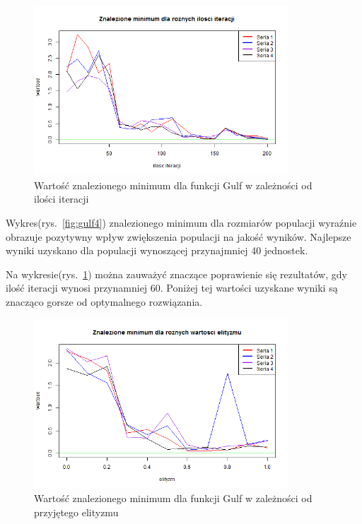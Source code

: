 \documentclass[11pt, a4paper]{article}
\newcommand{\fbi}{\leavevmode{\parindent=1em\indent}}
\begin{document}
\begin{figure}[H]
	\begin{center}
		\includegraphics[width=0.85\textwidth]{./assets/Gulf5.png} 
		\caption{Wartość znalezionego minimum dla funkcji Gulf w zależności od ilości iteracji}
		\label{fig:gulf5}
	\end{center}
\end{figure}

\fbi
Wykres(rys.~\ref{fig:gulf4}) znalezionego minimum dla rozmiarów populacji wyraźnie obrazuje pozytywny wpływ zwiększenia populacji na jakość wyników. Najlepsze wyniki uzyskano dla populacji wynoszącej przynajmniej 40 jednostek.

\fbi
Na wykresie(rys.~\ref{fig:gulf5}) można zauważyć znaczące poprawienie się rezultatów, gdy ilość iteracji wynosi przynamniej 60. Poniżej tej wartości uzyskane wyniki są znacząco gorsze od optymalnego rozwiązania. 

\begin{figure}[H]
	\begin{center}
		\includegraphics[width=0.85\textwidth]{./assets/Gulf6.png}
		\caption{Wartość znalezionego minimum dla funkcji Gulf w zależności od przyjętego elityzmu}
		\label{fig:gulf6}
	\end{center}
\end{figure}
\end{document}
